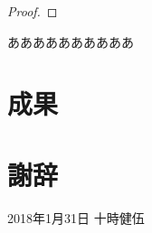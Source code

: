 \documentclass[12pt]{optlab-bachelor}
\def\氏名{十時健伍}
\begin{document}
\begin{proof}
\end{proof}

\begin{observation}
\end{observation}

\begin{proposition}
\end{proposition}

ああああああああああ
\chapter{成果}
\chapter*{謝辞}



\begin{flushright}
  2018年1月31日 \氏名
\end{flushright}
\endmatter
\end{document}
